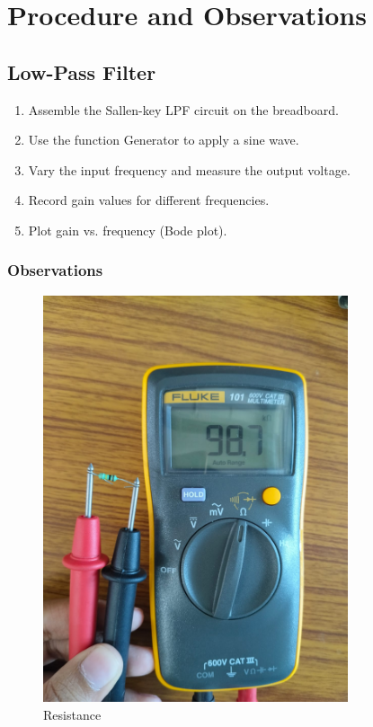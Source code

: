 \documentclass[a4paper,12pt]{article}
\begin{document}
\section{Procedure and Observations}
\subsection{Low-Pass Filter}
\begin{enumerate}
    \item Assemble the Sallen-key LPF circuit on the breadboard.
    \item Use the function Generator to apply a sine wave.
    \item Vary the input frequency and measure the output voltage.
    \item Record gain values for different frequencies.
    \item Plot gain vs. frequency (Bode plot).
\end{enumerate}
\subsubsection{Observations}

\begin{figure}[H]
    \centering
    \includegraphics[width=0.8\textwidth]{fig/m/100kohm.jpeg}
    \caption{Resistance}
    \label{fig:your-label}
\end{figure}
\end{document}
